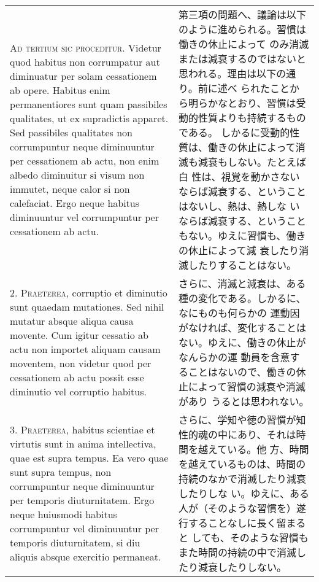 \documentclass[10pt]{jsarticle} %
\begin{document}
\begin{longtable}{p{21em}p{21em}}


{\scshape Ad tertium sic proceditur}. Videtur quod habitus non
corrumpatur aut diminuatur per solam cessationem ab opere. Habitus
enim permanentiores sunt quam passibiles qualitates, ut ex supradictis
apparet. Sed passibiles qualitates non corrumpuntur neque diminuuntur
per cessationem ab actu, non enim albedo diminuitur si visum non
immutet, neque calor si non calefaciat. Ergo neque habitus diminuuntur
vel corrumpuntur per cessationem ab actu.

&

第三項の問題へ、議論は以下のように進められる。習慣は働きの休止によって
のみ消滅または減衰するのではないと思われる。理由は以下の通り。前に述べ
られたことから明らかなとおり、習慣は受動的性質よりも持続するものである。
しかるに受動的性質は、働きの休止によって消滅も減衰もしない。たとえば白
性は、視覚を動かさないならば減衰する、ということはないし、熱は、熱しな
いならば減衰する、ということもない。ゆえに習慣も、働きの休止によって減
衰したり消滅したりすることはない。

\\



2. {\scshape Praeterea}, corruptio et diminutio sunt quaedam
mutationes. Sed nihil mutatur absque aliqua causa movente. Cum igitur
cessatio ab actu non importet aliquam causam moventem, non videtur
quod per cessationem ab actu possit esse diminutio vel corruptio
habitus.

&

さらに、消滅と減衰は、ある種の変化である。しかるに、なにものも何らかの
運動因がなければ、変化することはない。ゆえに、働きの休止がなんらかの運
動員を含意することはないので、働きの休止によって習慣の減衰や消滅があり
うるとは思われない。

\\



3. {\scshape Praeterea}, habitus scientiae et virtutis sunt in anima
intellectiva, quae est supra tempus. Ea vero quae sunt supra tempus,
non corrumpuntur neque diminuuntur per temporis diuturnitatem. Ergo
neque huiusmodi habitus corrumpuntur vel diminuuntur per temporis
diuturnitatem, si diu aliquis absque exercitio permaneat.

&

さらに、学知や徳の習慣が知性的魂の中にあり、それは時間を越えている。他
方、時間を越えているものは、時間の持続のなかで消滅したり減衰したりしな
い。ゆえに、ある人が（そのような習慣を）遂行することなしに長く留まると
しても、そのような習慣もまた時間の持続の中で消滅したり減衰したりしない。


\end{longtable}
\end{document}
